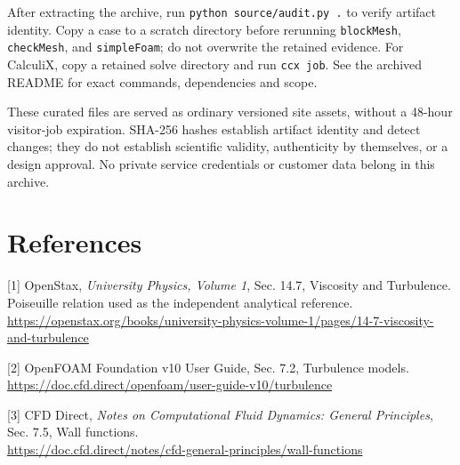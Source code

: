 \documentclass[10pt]{article}
\begin{document}
After extracting the archive, run \texttt{python source/audit.py .} to verify artifact identity. Copy a case to a scratch directory before rerunning \texttt{blockMesh}, \texttt{checkMesh}, and \texttt{simpleFoam}; do not overwrite the retained evidence. For CalculiX, copy a retained solve directory and run \texttt{ccx job}. See the archived README for exact commands, dependencies and scope.

These curated files are served as ordinary versioned site assets, without a 48-hour visitor-job expiration. SHA-256 hashes establish artifact identity and detect changes; they do not establish scientific validity, authenticity by themselves, or a design approval. No private service credentials or customer data belong in this archive.

\section{References}
\small [1] OpenStax, \emph{University Physics, Volume 1}, Sec. 14.7, Viscosity and Turbulence. Poiseuille relation used as the independent analytical reference.\\\url{https://openstax.org/books/university-physics-volume-1/pages/14-7-viscosity-and-turbulence}

[2] OpenFOAM Foundation v10 User Guide, Sec. 7.2, Turbulence models.\\\url{https://doc.cfd.direct/openfoam/user-guide-v10/turbulence}

[3] CFD Direct, \emph{Notes on Computational Fluid Dynamics: General Principles}, Sec. 7.5, Wall functions.\\\url{https://doc.cfd.direct/notes/cfd-general-principles/wall-functions}
\end{document}
